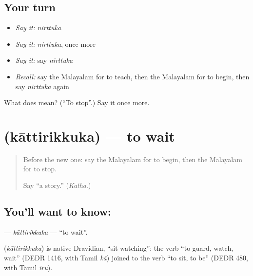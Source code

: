 \subsection*{Your turn}
\begin{itemize}
\raggedright
  \item \emph{Say it:} \emph{nirttuka}
  \item \emph{Say it:} \emph{nirttuka}, once more
  \item \emph{Say it:} say \emph{nirttuka}
  \item \emph{Recall:} say the Malayalam for to teach, then the Malayalam for to begin, then say \emph{nirttuka} again
\end{itemize}

\begin{tcolorbox}[breakable,colback=teal!4,colframe=teal!35!black,title={Before you move on}]
What does  mean? (\textquotedblleft{}To stop\textquotedblright{}.) Say it once more.
\end{tcolorbox}
\section[\texorpdfstring{\ml{കാത്തിരിക്കുക} (kāttirikkuka)}{കാത്തിരിക്കുക (kāttirikkuka)}]{ (kāttirikkuka) — to wait}

\label{lesson:ML-C174-kattirikkuka}



\begin{quote}
Before the new one: say the Malayalam for to begin, then the Malayalam for to stop.

Say \textquotedblleft{}a story.\textquotedblright{} (\emph{Katha}.)
\end{quote}

\subsection*{You'll want to know: }
\textbf{} — \emph{kāttirikkuka} — \textquotedblleft{}to wait\textquotedblright{}.

\begin{cousinweb}
\textbf{} (\emph{kāttirikkuka}) is native Dravidian, \textquotedblleft{}sit watching\textquotedblright{}: the verb \textquotedblleft{}to guard, watch, wait\textquotedblright{} (DEDR 1416, with Tamil \emph{kā}) joined to the verb \textquotedblleft{}to sit, to be\textquotedblright{} (DEDR 480, with Tamil \emph{iru}).
\end{cousinweb}

